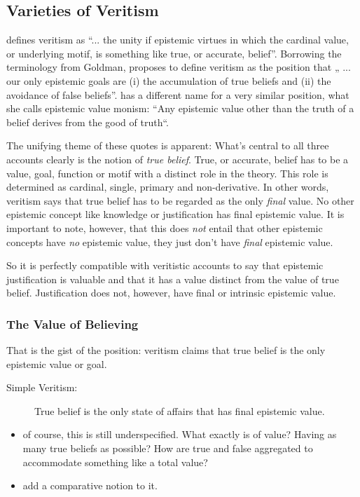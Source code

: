 \documentclass[12pt,numbers=noenddot]{scrartcl}
\begin{document}
\subsection{Varieties of Veritism}\label{sec:varieties}

\textcite[54]{Goldman2002-GOLTUO-2} defines veritism as  “... the unity if epistemic virtues in which the cardinal value, or underlying motif, is something like true, or accurate, belief”. Borrowing the terminology from Goldman, \textcite[360]{Berker2013-BERETA-2} proposes to define veritism as the position that „ ... our only epistemic goals are (i) the accumulation of true beliefs and (ii) the avoidance of false beliefs”. \textcite{Zagzebski2004-ZAGEVM-2} has a different name for a very similar position, what she calls epistemic value monism: “Any epistemic value other than the truth of a belief derives from the good of truth“. 

The unifying theme of these quotes is apparent: What’s central to all three accounts clearly is the notion of \emph{true belief}. True, or accurate, belief has to be a value, goal, function or motif with a distinct role in the theory. This role is determined as cardinal, single, primary and non-derivative. In other words, veritism says that true belief has to be regarded as the only \emph{final} value. No other epistemic concept like knowledge or justification has final epistemic value. It is important to note, however, that this does \emph{not} entail that other epistemic concepts have \emph{no} epistemic value, they just don’t have \emph{final} epistemic value.

So it is perfectly compatible with veritistic accounts to say that epistemic justification is valuable and that it has a value distinct from the value of true belief. Justification does not, however, have final or intrinsic epistemic value.

\subsubsection{The Value of Believing}
That is the gist of the position: veritism claims that true belief is the only epistemic value or goal. 

\begin{description}
    \item[Simple Veritism:] True belief is the only state of affairs that has final epistemic value.
\end{description}

\begin{itemize}
    \item of course, this is still underspecified. What exactly is of value? Having as many true beliefs as possible? How are true and false aggregated to accommodate something like a total value?
    \item add a comparative notion to it.
\end{itemize}
\end{document}
